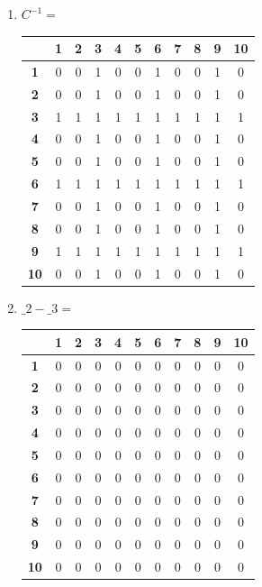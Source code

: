 \documentclass[a4paper,14pt]{extarticle}
\begin{document}
\begin{enumerate}[label=1.\arabic*.]
\begin{enumerate}[1) ]
\begin{tabular}{|c|c|c|c|c|c|c|c|c|c|c|}
\end{tabular}
\item $C^{-1} = $  \begin{tabular}{|c|c|c|c|c|c|c|c|c|c|c|}
	\hline
	&\textbf{1}&\textbf{2}&\textbf{3}&\textbf{4}&\textbf{5}&\textbf{6}&\textbf{7}&\textbf{8}&\textbf{9}&\textbf{10}\\
	\hline\textbf{1}&0&0&1&0&0&1&0&0&1&0\\
	\hline\textbf{2}&0&0&1&0&0&1&0&0&1&0\\
	\hline\textbf{3}&1&1&1&1&1&1&1&1&1&1\\
	\hline\textbf{4}&0&0&1&0&0&1&0&0&1&0\\
	\hline\textbf{5}&0&0&1&0&0&1&0&0&1&0\\
	\hline\textbf{6}&1&1&1&1&1&1&1&1&1&1\\
	\hline\textbf{7}&0&0&1&0&0&1&0&0&1&0\\
	\hline\textbf{8}&0&0&1&0&0&1&0&0&1&0\\
	\hline\textbf{9}&1&1&1&1&1&1&1&1&1&1\\
	\hline\textbf{10}&0&0&1&0&0&1&0&0&1&0\\
	\hline
	
\end{tabular}
\item $\_2 - \_3 = $  \begin{tabular}{|c|c|c|c|c|c|c|c|c|c|c|}
	\hline
	&\textbf{1}&\textbf{2}&\textbf{3}&\textbf{4}&\textbf{5}&\textbf{6}&\textbf{7}&\textbf{8}&\textbf{9}&\textbf{10}\\
	\hline\textbf{1}&0&0&0&0&0&0&0&0&0&0\\
	\hline\textbf{2}&0&0&0&0&0&0&0&0&0&0\\
	\hline\textbf{3}&0&0&0&0&0&0&0&0&0&0\\
	\hline\textbf{4}&0&0&0&0&0&0&0&0&0&0\\
	\hline\textbf{5}&0&0&0&0&0&0&0&0&0&0\\
	\hline\textbf{6}&0&0&0&0&0&0&0&0&0&0\\
	\hline\textbf{7}&0&0&0&0&0&0&0&0&0&0\\
	\hline\textbf{8}&0&0&0&0&0&0&0&0&0&0\\
	\hline\textbf{9}&0&0&0&0&0&0&0&0&0&0\\
	\hline\textbf{10}&0&0&0&0&0&0&0&0&0&0\\
	\hline
	
\end{tabular}


\end{enumerate}
\end{enumerate}
\end{document}
